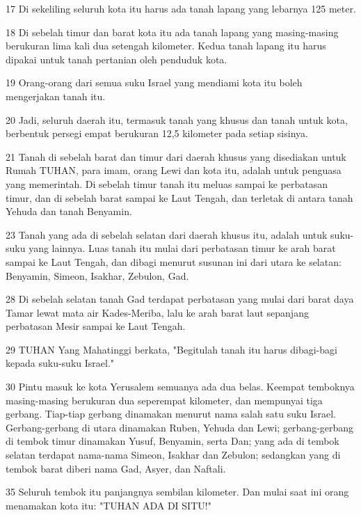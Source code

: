 \par 17 Di sekeliling seluruh kota itu harus ada tanah lapang yang lebarnya 125 meter.
\par 18 Di sebelah timur dan barat kota itu ada tanah lapang yang masing-masing berukuran lima kali dua setengah kilometer. Kedua tanah lapang itu harus dipakai untuk tanah pertanian oleh penduduk kota.
\par 19 Orang-orang dari semua suku Israel yang mendiami kota itu boleh mengerjakan tanah itu.
\par 20 Jadi, seluruh daerah itu, termasuk tanah yang khusus dan tanah untuk kota, berbentuk persegi empat berukuran 12,5 kilometer pada setiap sisinya.
\par 21 Tanah di sebelah barat dan timur dari daerah khusus yang disediakan untuk Rumah TUHAN, para imam, orang Lewi dan kota itu, adalah untuk penguasa yang memerintah. Di sebelah timur tanah itu meluas sampai ke perbatasan timur, dan di sebelah barat sampai ke Laut Tengah, dan terletak di antara tanah Yehuda dan tanah Benyamin.
\par 23 Tanah yang ada di sebelah selatan dari daerah khusus itu, adalah untuk suku-suku yang lainnya. Luas tanah itu mulai dari perbatasan timur ke arah barat sampai ke Laut Tengah, dan dibagi menurut susunan ini dari utara ke selatan: Benyamin, Simeon, Isakhar, Zebulon, Gad.
\par 28 Di sebelah selatan tanah Gad terdapat perbatasan yang mulai dari barat daya Tamar lewat mata air Kades-Meriba, lalu ke arah barat laut sepanjang perbatasan Mesir sampai ke Laut Tengah.
\par 29 TUHAN Yang Mahatinggi berkata, "Begitulah tanah itu harus dibagi-bagi kepada suku-suku Israel."
\par 30 Pintu masuk ke kota Yerusalem semuanya ada dua belas. Keempat temboknya masing-masing berukuran dua seperempat kilometer, dan mempunyai tiga gerbang. Tiap-tiap gerbang dinamakan menurut nama salah satu suku Israel. Gerbang-gerbang di utara dinamakan Ruben, Yehuda dan Lewi; gerbang-gerbang di tembok timur dinamakan Yusuf, Benyamin, serta Dan; yang ada di tembok selatan terdapat nama-nama Simeon, Isakhar dan Zebulon; sedangkan yang di tembok barat diberi nama Gad, Asyer, dan Naftali.
\par 35 Seluruh tembok itu panjangnya sembilan kilometer. Dan mulai saat ini orang menamakan kota itu: "TUHAN ADA DI SITU!"


